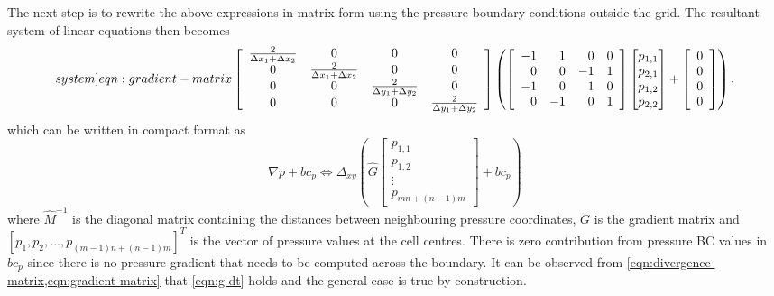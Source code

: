 \documentclass{article}
\numberwithin{equation}{section}
\begin{document}
The next step is to rewrite the above expressions in matrix form using the pressure boundary conditions outside the grid. The resultant system of linear equations then becomes
\begin{equation}\label[system]{eqn:gradient-matrix}
\left[\begin{array}{cccccc}
\frac{2}{\Delta x_1+\Delta x_2}  &  0 & 0 & 0 \\
0 & \frac{2}{\Delta x_1+\Delta x_2} &  0 & 0 \\
0 &  0 & \frac{2}{\Delta y_1+\Delta y_2} & 0 \\
0 & 0 & 0 & \frac{2}{\Delta y_1+\Delta y_2}
\end{array}\right]
\left(\left[\begin{array}{rrrr}
-1 & 1 & 0 & 0 \\
0 & 0 & -1 & 1 \\
-1 & 0 & 1 & 0 \\
0 & -1 & 0 & 1
\end{array}\right]
\begin{bmatrix}{}
  p_{1,1} \\
  p_{2,1} \\
  p_{1,2} \\
  p_{2,2} 
\end{bmatrix}
+\left[\begin{array}{c}
0 \\
0 \\
0 \\
0
\end{array}\right]
\right)
,
\end{equation}
which can be written in compact format as
$$
\nabla p+b c_p \Longleftrightarrow 
\Delta_{x y} \left(\hat{G}\left[\begin{array}{c}
p_{1,1} \\
p_{1,2} \\
\vdots \\
p_{m n+(n-1) m}
\end{array}\right]+b c_p\right)
$$
where $\hat{M}^{-1}$ is the diagonal matrix containing the distances between neighbouring pressure coordinates, ${G}$ is the gradient matrix and $[p_1,p_2,...,p_{(m-1) n+(n-1) m}]^T$ is the vector of pressure values at the cell centres. There is zero contribution from pressure BC values in ${bc}_p$ since there is no  pressure gradient that needs to be computed across the boundary. It can be observed from \cref{eqn:divergence-matrix,eqn:gradient-matrix} that \cref{eqn:g-dt} holds and the general case is true by construction.
\end{document}

